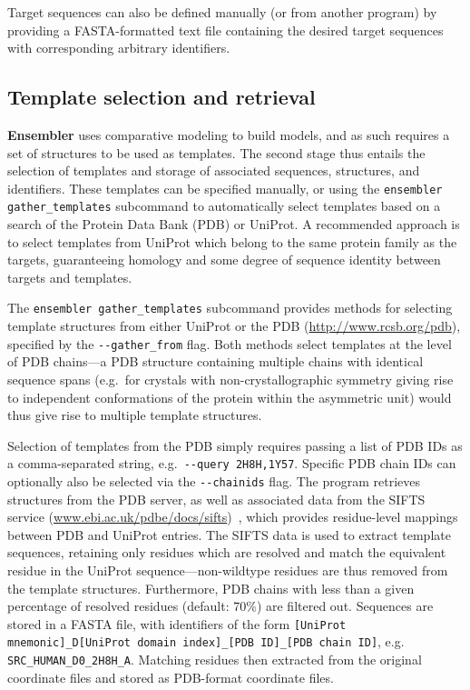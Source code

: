 \documentclass[aps,pre,twocolumn,nofootinbib,superscriptaddress,linenumbers]{revtex4-1}
\begin{document}
Target sequences can also be defined manually (or from another program) by providing a FASTA-formatted text file containing the desired target sequences with corresponding arbitrary identifiers.

\subsection{Template selection and retrieval}

{\bf Ensembler} uses comparative modeling to build models, and as such requires a set of structures to be used as templates.
The second stage thus entails the selection of templates and storage of associated sequences, structures, and identifiers.
These templates can be specified manually, or using the {\tt ensembler gather\_templates} subcommand to automatically select templates based on a search of the Protein Data Bank (PDB) or UniProt.
\color{red}
A recommended approach is to select templates from UniProt which belong to the same protein family as the targets, guaranteeing homology and some degree of sequence identity between targets and templates.
\color{black}

The {\tt ensembler gather\_templates} subcommand provides methods for selecting template structures from either UniProt or the PDB (\url{http://www.rcsb.org/pdb}), specified by the {\tt -{}-gather\_from} flag.
\color{red}
Both methods select templates at the level of PDB chains---a PDB structure containing multiple chains with identical sequence spans (e.g.~for crystals with non-crystallographic symmetry giving rise to independent conformations of the protein within the asymmetric unit) would thus give rise to multiple template structures.
\color{black}

Selection of templates from the PDB simply requires passing a list of PDB IDs as a comma-separated string, e.g.~{\tt -{}-query 2H8H,1Y57}.
Specific PDB chain IDs can optionally also be selected via the {\tt -{}-chainids} flag.
The program retrieves structures from the PDB server, as well as associated data from the SIFTS service (\href{http://www.ebi.ac.uk/pdbe/docs/sifts/}{www.ebi.ac.uk/pdbe/docs/sifts})~\cite{velankar:2013:sifts}, which provides residue-level mappings between PDB and UniProt entries.
The SIFTS data is used to extract template sequences, retaining only residues which are resolved and match the equivalent residue in the UniProt sequence---non-wildtype residues are thus removed from the template structures.
Furthermore, PDB chains with less than a given percentage of resolved residues (default: 70\%) are filtered out.
Sequences are stored in a FASTA file, with identifiers of the form {\tt [UniProt mnemonic]\_D[UniProt domain index]\_[PDB ID]\_[PDB chain ID]}, e.g. {\tt SRC\_HUMAN\_D0\_2H8H\_A}.
Matching residues then extracted from the original coordinate files and stored as PDB-format coordinate files.
\end{document}
